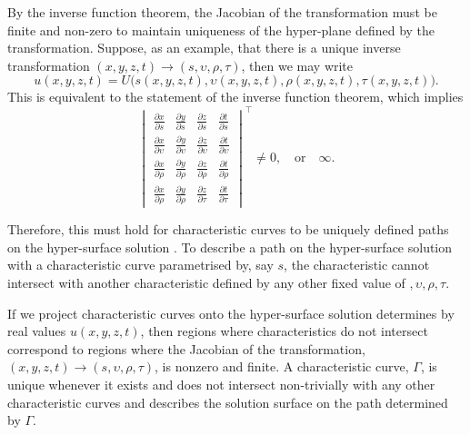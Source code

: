 \documentclass[12pt]{article}
\theoremstyle{definition}
\numberwithin{equation}{section}
\begin{document}
{By the inverse function theorem, the Jacobian of the transformation must be finite and non-zero to maintain uniqueness of the hyper-plane defined by the transformation. Suppose, as an example, that there is a unique inverse transformation $(x,y,z,t)\rightarrow(s,\upsilon,\rho,\tau)$, then we may write $$u(x,y,z,t)=U\Big(s(x,y,z,t),\upsilon(x,y,z,t),\rho(x,y,z,t),\tau(x,y,z,t)\Big).$$ This is equivalent to the statement of the inverse function theorem, which implies
\begin{equation}
\begin{vmatrix}
\frac{\partial x}{\partial s} &\frac{\partial y}{\partial s} &\frac{\partial z}{\partial s} &\frac{\partial t}{\partial s}\\ 
\frac{\partial x}{\partial \upsilon} & \frac{\partial y}{\partial \upsilon}& \frac{\partial z}{\partial \upsilon}& \frac{\partial t}{\partial \upsilon}\\
\frac{\partial x}{\partial \rho} & \frac{\partial y}{\partial \rho}& \frac{\partial z}{\partial \rho}& \frac{\partial t}{\partial \rho}\\
\frac{\partial x}{\partial \rho} & \frac{\partial y}{\partial \rho}& \frac{\partial z}{\partial \tau}& \frac{\partial t}{\partial \tau}
\end{vmatrix}^{\intercal}\neq 0,\quad\mbox{or}\quad\infty.
\label{charexist.eqn}
\end{equation}

Therefore, this must hold for characteristic curves to be uniquely defined paths on the hyper-surface solution . To describe a path on the hyper-surface solution with a characteristic curve parametrised by, say $s$, the characteristic cannot intersect with another characteristic defined by any other fixed value of $,\upsilon,\rho,\tau$.

If we project characteristic curves onto the hyper-surface solution determines by real values $u(x,y,z,t)$, then regions where characteristics do not intersect correspond to regions where the Jacobian of the transformation, $(x,y,z,t)\rightarrow(s,\upsilon,\rho,\tau)$, is nonzero and finite. A characteristic curve, $\Gamma$, is unique whenever it exists and does not intersect non-trivially with any other characteristic curves and describes the solution surface on the path determined by $\Gamma$.

}
\end{document}

